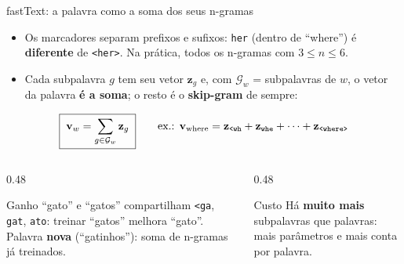 \begin{frame}{fastText: a palavra como a soma dos seus n-gramas}
    \vspace{-0.25cm}
    \raggedright
    \scriptsize
    \begin{itemize}
        \item Os marcadores separam prefixos e sufixos: \texttt{her} (dentro de ``where'') é \textbf{diferente} de \texttt{<her>}. Na prática, todos os n-gramas com $3 \le n \le 6$.
        \item Cada subpalavra $g$ tem seu vetor $\mathbf{z}_g$ e, com $\mathcal{G}_w$ = subpalavras de $w$, o vetor da palavra \textbf{é a soma}; o resto é o \textbf{skip-gram} de sempre:
    \end{itemize}
    \vspace{-0.15cm}
    \begin{equation*}
        \boxed{\;\mathbf{v}_w = \sum_{g \in \mathcal{G}_w} \mathbf{z}_g\;}
        \qquad
        \text{ex.: } \mathbf{v}_{\text{where}} = \mathbf{z}_{\texttt{<wh}} + \mathbf{z}_{\texttt{whe}} + \cdots + \mathbf{z}_{\texttt{<where>}}
    \end{equation*}
    \vspace{-0.3cm}
    \begin{columns}[t]
        \begin{column}{0.48\textwidth}
            \begin{exampleblock}{Ganho}
                \scriptsize
                ``gato'' e ``gatos'' compartilham \texttt{<ga}, \texttt{gat}, \texttt{ato}: treinar ``gatos'' melhora ``gato''. Palavra \textbf{nova} (``gatinhos''): soma de n-gramas já treinados.
            \end{exampleblock}
        \end{column}
        \begin{column}{0.48\textwidth}
            \begin{alertblock}{Custo}
                \scriptsize
                Há \textbf{muito mais} subpalavras que palavras: mais parâmetros e mais conta por palavra.
            \end{alertblock}
        \end{column}
    \end{columns}


\end{frame}
